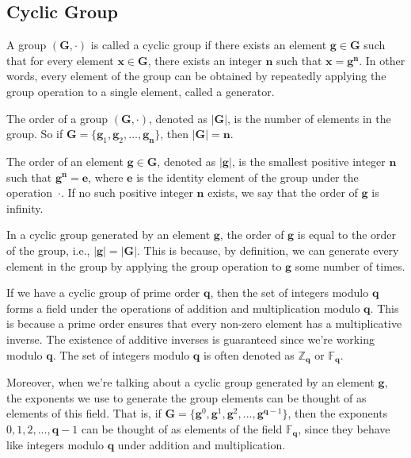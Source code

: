 \subsection{Cyclic Group}
A group $(\mathbf{G}, \cdot)$ is called a cyclic group if there exists an element $\mathbf{g} \in \mathbf{G}$ such that for every element $\mathbf{x} \in \mathbf{G}$, there exists an integer $\mathbf{n}$ such that $\mathbf{x} = \mathbf{g}^\mathbf{n}$. In other words, every element of the group can be obtained by repeatedly applying the group operation to a single element, called a generator.

The order of a group $(\mathbf{G}, \cdot)$, denoted as $|\mathbf{G}|$, is the number of elements in the group. So if $\mathbf{G} = \{\mathbf{g}_1, \mathbf{g}_2, \ldots, \mathbf{g}_\mathbf{n}\}$, then $|\mathbf{G}| = \mathbf{n}$.

The order of an element $\mathbf{g} \in \mathbf{G}$, denoted as $|\mathbf{g}|$, is the smallest positive integer $\mathbf{n}$ such that $\mathbf{g}^\mathbf{n} = \mathbf{e}$, where $\mathbf{e}$ is the identity element of the group under the operation~$\cdot$. If no such positive integer $\mathbf{n}$ exists, we say that the order of $\mathbf{g}$ is infinity.

In a cyclic group generated by an element $\mathbf{g}$, the order of $\mathbf{g}$ is equal to the order of the group, i.e., $|\mathbf{g}| = |\mathbf{G}|$. This is because, by definition, we can generate every element in the group by applying the group operation to $\mathbf{g}$ some number of times.

If we have a cyclic group of prime order $\mathbf{q}$, then the set of integers modulo $\mathbf{q}$ forms a field under the operations of addition and multiplication modulo $\mathbf{q}$. This is because a prime order ensures that every non-zero element has a multiplicative inverse. The existence of additive inverses is guaranteed since we're working modulo $\mathbf{q}$. The set of integers modulo $\mathbf{q}$ is often denoted as $\mathbb{Z}_\mathbf{q}$ or $\mathbb{F}_\mathbf{q}$.

Moreover, when we're talking about a cyclic group generated by an element $\mathbf{g}$, the exponents we use to generate the group elements can be thought of as elements of this field. That is, if $\mathbf{G} = \{\mathbf{g}^0, \mathbf{g}^1, \mathbf{g}^2, ..., \mathbf{g}^{\mathbf{q}-1}\}$, then the exponents $0, 1, 2, ..., \mathbf{q}-1$ can be thought of as elements of the field $\mathbb{F}_\mathbf{q}$, since they behave like integers modulo $\mathbf{q}$ under addition and multiplication.

